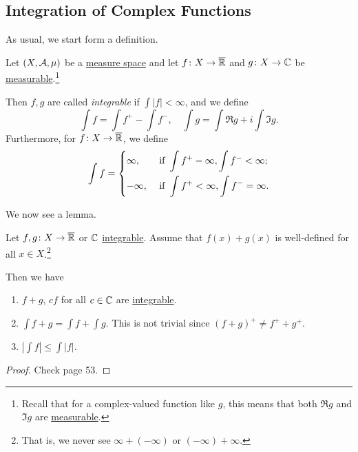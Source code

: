 \subsection{Integration of Complex Functions}
As usual, we start form a definition.
\begin{definition}[Integrable]\label{def:integrable}
	Let \((X, \mathcal{\MakeUppercase{a}} , \mu )\) be a \hyperref[def:measure-space]{measure space} and let \(f\colon X\to \overline{\mathbb{\MakeUppercase{r}} }\) and \(g\colon X\to \mathbb{\MakeUppercase{c}} \)
	be \hyperref[def:measurable-function]{measurable}.\footnote{Recall that for a complex-valued function like \(g\), this means that both \(\Re g\) and \(\Im g\) are \hyperref[def:measurable-function]{measurable}.}

	\par Then \(f, g\) are called \emph{integrable} if \(\int \left\vert f \right\vert < \infty \), and we define
	\[
		\int f = \int f^+ - \int f^-,\quad \int g = \int \Re g + i \int \Im g.
	\]
	Furthermore, for \(f\colon X\to \overline{\mathbb{\MakeUppercase{r}} }\), we define
	\[
		\int f = \begin{dcases}
			\infty ,  & \text{ if }  \int f^+ - \infty , \int f^- < \infty ; \\
			-\infty , & \text{ if }  \int f^+ < \infty , \int f^- = \infty .
		\end{dcases}
	\]
\end{definition}

We now see a lemma.
\begin{lemma}
	Let \(f, g\colon X\to \overline{\mathbb{\MakeUppercase{r}} }\) or \(\mathbb{\MakeUppercase{c}} \) \hyperref[def:integrable]{integrable}. Assume that \(f(x) + g(x)\) is well-defined
	for all \(x\in X\).\footnote{That is, we never see \(\infty + (-\infty )\) or \((-\infty ) + \infty \).}

	\par Then we have
	\begin{enumerate}
		\item \(f+g\), \(cf\) for all \(c\in \mathbb{\MakeUppercase{c}} \) are \hyperref[def:integrable]{integrable}.
		      \item\label{lma:linearity-of-integral} \(\int f + g = \int f + \int g\). This is not trivial since \((f+g)^+ \neq f^+ + g^+\).
		\item \(\left\vert \int f \right\vert \leq \int \left\vert f \right\vert \).
	\end{enumerate}
\end{lemma}
\begin{proof}
	Check \cite{folland1999real} page 53.
\end{proof}

